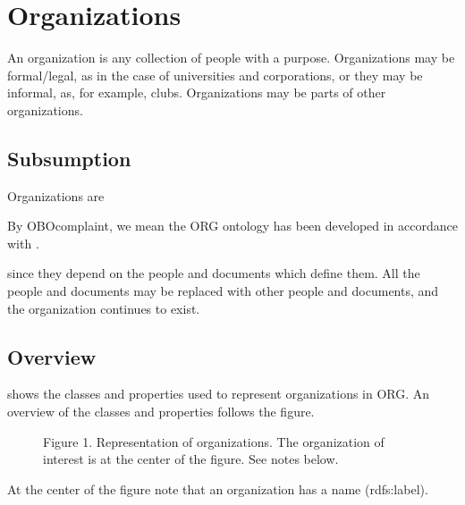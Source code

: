 \documentclass[letterpaper,10pt,english]{sphinxmanual}
\begin{document}
\chapter{Organizations}
\label{\detokenize{organizations:organizations}}\label{\detokenize{organizations:id1}}\label{\detokenize{organizations::doc}}
\sphinxAtStartPar
An organization is any collection of people with a purpose.  Organizations may be
formal/legal, as in the case of universities and corporations, or they may be informal,
as, for example, clubs.  Organizations may be parts of other organizations.


\section{Subsumption}
\label{\detokenize{organizations:subsumption}}
\sphinxAtStartPar
Organizations are {\hyperref[\detokenize{glossary:glossary}]{}} %
\begin{footnote}[1]\sphinxAtStartFootnote
By OBO\sphinxhyphen{}complaint, we mean the ORG ontology has been developed in accordance with
.
%
\end{footnote} since they
depend
on the people and documents which define them. All the people and documents may be
replaced with
other people and documents, and the organization continues to exist.


\section{Overview}
\label{\detokenize{organizations:overview}}
\sphinxAtStartPar
{\hyperref[\detokenize{organizations:figure-1}]{}} shows the classes and properties used to represent organizations in ORG.
An overview of the classes and properties follows the figure.

\begin{figure}[htbp]
\centering
\capstart

\noindent{}
\caption{Figure 1.  Representation of organizations.  The organization of interest is at the
center of the figure.  See notes below.}\label{\detokenize{organizations:id5}}\label{\detokenize{organizations:figure-1}}\end{figure}

\sphinxAtStartPar
At the center of the figure note that an organization has a name (rdfs:label).
\end{document}
